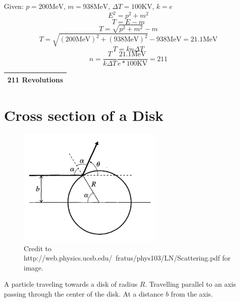 \documentclass[12pt]{article}
\begin{document}
Given: $p = 200 \textrm{MeV}$, $m = 938 \textrm{MeV}$, $\Delta{T}=100\textrm{KV}$, $k=e$
\begin{equation}
E^2 = p^2 + m^2
\end{equation}
\begin{equation}
T = E - m
\end{equation}
\begin{equation}
T = \sqrt{p^2+m^2}  - m
\end{equation}
\begin{equation}
  T = \sqrt{(200 \textrm{MeV})^2+(938 \textrm{MeV})^2}  - 938 \textrm{MeV} = 21.1\textrm{MeV} 
\end{equation}
\begin{equation}
  T = kn\Delta{T}
\end{equation}
\begin{equation}
  n = \frac{T}{k\Delta{T}} \frac{21.1 \textrm{MeV}}{e*100\textrm{KV}}= 211
\end{equation}
\begin{table}[h]
  \centering
  \begin{tabular}{|c|}
    \hline
      \bf 211 Revolutions \\
    \hline
  \end{tabular}
\end{table}

\section{Cross section of a Disk}

\begin{figure}[h]
  \centering
  \includegraphics[width=200pt]{disk_scatter.png}
  \caption{Credit to http://web.physics.ucsb.edu/~fratus/phys103/LN/Scattering.pdf for image.}
  \label{fig:disk}
\end{figure}

A particle traveling towards a disk of radius $R$. Travelling parallel to an axis passing through the center of the disk. At a distance $b$ from the axis.
\end{document}

